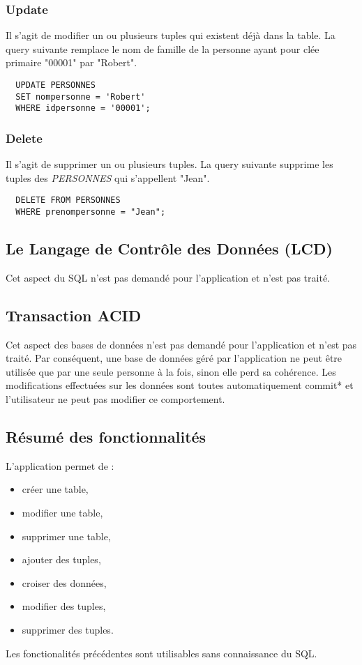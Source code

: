 \subsubsection{Update}
Il s'agit de modifier un ou plusieurs tuples qui existent déjà dans la table.
La \gls{query} suivante remplace le nom de famille de la personne ayant pour clée primaire "00001" par "Robert".
\begin{lstlisting}
  UPDATE PERSONNES
  SET nompersonne = 'Robert'
  WHERE idpersonne = '00001';
\end{lstlisting}

\subsubsection{Delete}
Il s'agit de supprimer un ou plusieurs \glspl{tuple}.
La \gls{query} suivante supprime les tuples des \textit{PERSONNES} qui s'appellent "Jean".
\begin{lstlisting}
  DELETE FROM PERSONNES
  WHERE prenompersonne = "Jean";
\end{lstlisting}

\subsection{Le Langage de Contrôle des Données (LCD)}
Cet aspect du SQL n'est pas demandé pour l'application et n'est pas traité.

\subsection{Transaction ACID}
Cet aspect des bases de données n'est pas demandé pour l'application et n'est pas traité.
Par conséquent, une base de données géré par l'application ne peut être utilisée que par une seule personne à la fois, sinon elle perd sa cohérence.
Les modifications effectuées sur les données sont toutes automatiquement \gls{commit}* et l'utilisateur ne peut pas modifier ce comportement.

\subsection{Résumé des fonctionnalités}
L'application permet de :
\begin{itemize}
\item créer une table,
\item modifier une table,
\item supprimer une table,
\item ajouter des tuples,
\item croiser des données,
\item modifier des tuples,
\item supprimer des tuples.
\end{itemize}

Les fonctionalités précédentes sont utilisables sans connaissance du SQL.
